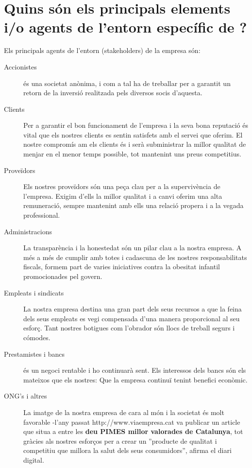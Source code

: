 \section{Quins són els principals elements i/o agents de l’entorn específic de \QnF?}

Els principals agents de l'entorn (stakeholders) de la empresa són:

\begin{description}
  \item[Accionistes] \QnF és una societat anònima, i com a tal ha de treballar per a garantit un retorn de la inversió realitzada pels diversos socis d'aquesta.
  \item[Clients] Per a garantir el bon funcionament de l'empresa i la seva bona reputació és vital que els nostres clients es sentin satisfets amb el servei que oferim. El nostre compromís am els clients és i serà subministrar la millor qualitat de menjar en el menor temps possible, tot mantenint uns preus competitius.
  \item[Proveïdors] Els nostres proveïdors són una peça clau per a la supervivència de l'empresa. Exigim d'ells la millor qualitat i a canvi oferim una alta remuneració, sempre mantenint amb ells una relació propera i a la vegada professional.
  \item[Administracions] La transparència i la honestedat són un pilar clau a la nostra empresa. A més a més de cumplir amb totes i cadascuna de les nostres responsabilitats fiscals, formem part de varies iniciatives contra la obesitat infantil promocionades pel govern.
  \item[Empleats i sindicats] La nostra empresa destina una gran part dels seus recursos a que la feina dels seus empleats es vegi compensada d'una manera proporcional al seu esforç. Tant nostres botigues com l'obrador són llocs de treball segurs i cómodes.
  \item[Prestamistes i bancs] \QnF és un negoci rentable i ho continuarà sent. Els interessos dels bancs són els mateixos que els nostres: Que la empresa continuï tenint benefici econòmic.
  \item[ONG's i altres] La imatge de la nostra empresa de cara al món i la societat és molt favorable -l'any passat http://www.viaempresa.cat va publicar un article que situa a \QnF entre les \textbf{deu PIMES millor valorades de Catalunya}, tot gràcies als nostres esforços per a crear un ''producte de qualitat i competitiu que millora la salut dels seus consumidors'', afirma el diari digital.
\end{description}
